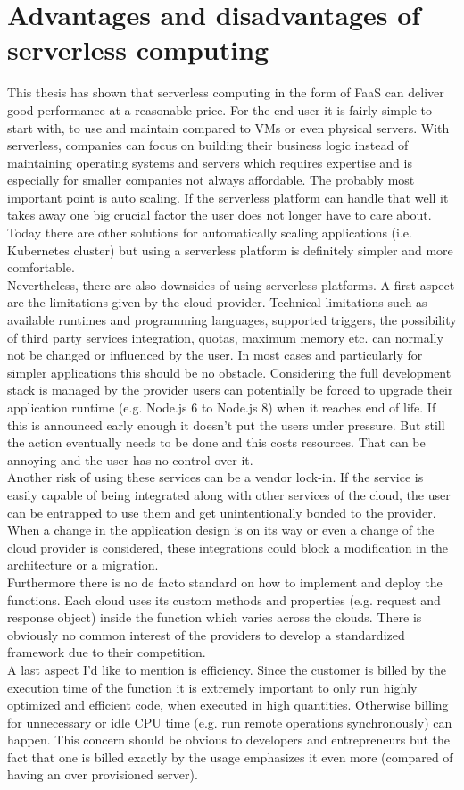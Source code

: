 \section{Advantages and disadvantages of serverless computing}
This thesis has shown that serverless computing in the form of \gls{FaaS} can deliver good performance at a reasonable price. For the end user it is fairly simple to start with, to use and maintain compared to \gls{VM}s or even physical servers. With serverless, companies can focus on building their business logic instead of maintaining operating systems and servers which requires expertise and is especially for smaller companies not always affordable. The probably most important point is auto scaling. If the serverless platform can handle that well it takes away one big crucial factor the user does not longer have to care about. Today there are other solutions for automatically scaling applications (i.e. Kubernetes cluster) but using a serverless platform is definitely simpler and more comfortable.\\
Nevertheless, there are also downsides of using serverless platforms. A first aspect are the limitations given by the cloud provider. Technical limitations such as available runtimes and programming languages, supported triggers, the possibility of third party services integration, quotas, maximum memory etc. can normally not be changed or influenced by the user. In most cases and particularly for simpler applications this should be no obstacle. Considering the full development stack is managed by the provider users can potentially be forced to upgrade their application runtime (e.g. Node.js 6 to Node.js 8) when it reaches end of life. If this is announced early enough it doesn't put the users under pressure. But still the action eventually needs to be done and this costs resources. That can be annoying and the user has no control over it.\\
Another risk of using these services can be a vendor lock-in. If the service is easily capable of being integrated along with other services of the cloud, the user can be entrapped to use them and get unintentionally bonded to the provider. When a change in the application design is on its way or even a change of the cloud provider is considered, these integrations could block a modification in the architecture or a migration.\\
Furthermore there is no de facto standard on how to implement and deploy the functions. Each cloud uses its custom methods and properties (e.g. request and response object) inside the function which varies across the clouds. There is obviously no common interest of the providers to develop a standardized framework due to their competition.\\
A last aspect I'd like to mention is efficiency. Since the customer is billed by the execution time of the function it is extremely important to only run highly optimized and efficient code, when executed in high quantities. Otherwise billing for unnecessary or idle \gls{CPU} time (e.g. run remote operations synchronously) can happen. This concern should be obvious to developers and entrepreneurs but the fact that one is billed exactly by the usage emphasizes it even more (compared of having an over provisioned server).
